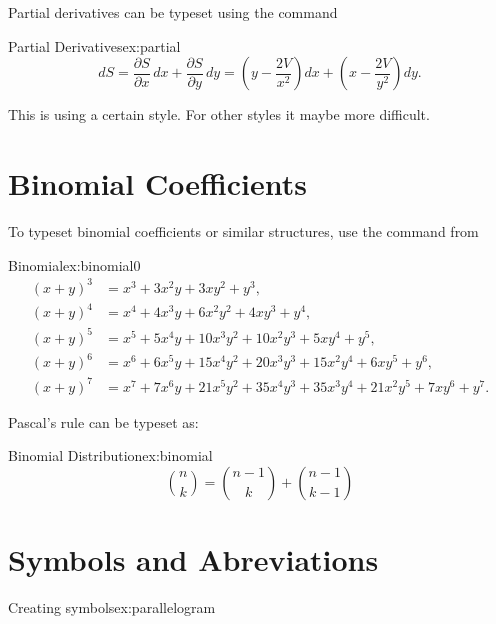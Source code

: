 {{{Partial derivatives can be typeset using the \latex{} command 

\begin{texexample}{Partial Derivatives}{ex:partial}
\[
dS = \frac{\partial S}{\partial x}\, dx
   + \frac{\partial S}{\partial y}\, dy
   = \left(y - \frac{2V}{x^2}\right) dx
   + \left(x - \frac{2V}{y^2}\right) dy.
\]
\meaning\partial
\end{texexample}


This is using a certain style. For other styles it maybe more difficult.

\section*{Binomial Coefficients}

To typeset binomial coefficients or similar structures, use the command
 from 

\begin{texexample}{Binomial}{ex:binomial0}
\[
\begin{align}
(x+y)^3 & = x^3 + 3x^2y + 3xy^2 + y^3, \\[8pt]
(x+y)^4 & = x^4 + 4x^3y + 6x^2y^2 + 4xy^3 + y^4, \\[8pt]
(x+y)^5 & = x^5 + 5x^4y + 10x^3y^2 + 10x^2y^3 + 5xy^4 + y^5, \\[8pt]
(x+y)^6 & = x^6 + 6x^5y + 15x^4y^2 + 20x^3y^3 + 15x^2y^4 + 6xy^5 + y^6, \\[8pt]
(x+y)^7 & = x^7 + 7x^6y + 21x^5y^2 + 35x^4y^3 + 35x^3y^4 + 21x^2y^5 + 7xy^6 + y^7.
\end{align}
\]
\end{texexample}


Pascal's rule can be typeset as:


\begin{texexample}{Binomial Distribution}{ex:binomial}
\[
\binom{n}{k} =\binom{n-1}{k}
+ \binom{n-1}{k-1}
\]
\end{texexample}



\section[Symbols and Abbreviations]{Symbols and Abreviations}
\label{math:abbreviations}

\label{abbr}\label{symbols}%

\begin{texexample}{Creating symbols}{ex:parallelogram}
\newlength{\dentwidth}\setlength{\dentwidth}{\textwidth}
\addtolength{\dentwidth}{-\parindent}


\end{texexample}}}}
